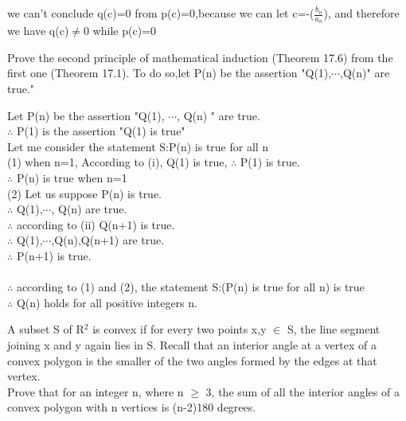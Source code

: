 \documentclass[11pt, a4paper, UTF8]{ctexart}
\begin{document}
\begin{solution}
we can't conclude q(c)=0 from p(c)=0,because we can let c=-($\frac{b_n}{a_n}$), and therefore we have q(c)$\not=0$ while p(c)=0\\

\end{solution}



\begin{problem}[UD:17.14]
  Prove the second principle of mathematical induction (Theorem 17.6) from the first one (Theorem 17.1). To do so,let P(n) be the assertion "Q(1),$\cdots$,Q(n)" are true."
\end{problem}

\begin{solution}
Let P(n) be the  assertion "Q(1), $\cdots$, Q(n) " are true.\\
$\therefore$ P(1) is the assertion "Q(1) is true"\\
Let me consider the statement S:P(n) is true for all n\\
(1) when n=1, According to (i), Q(1) is true, $\therefore$ P(1) is true.\\
$\therefore $ P(n) is true when n=1\\
(2) Let us suppose P(n) is true.\\
$\therefore$ Q(1),$\cdots$, Q(n) are true.\\
$\therefore$ according to (ii) Q(n+1) is true.\\
$\therefore$ Q(1),$\cdots$,Q(n),Q(n+1) are true.\\
$\therefore$ P(n+1) is true.\\
\\
$\therefore$ according to (1) and (2), the statement S:(P(n) is true for all n) is true\\
$\therefore$ Q(n) holds for all positive integers n.

\end{solution}



\begin{problem}[UD:17.16]
A subset S of R$^2$ is convex if for every two points x,y $\in$ S, the line segment joining x and y again lies in S. Recall that an interior angle at a vertex of a convex polygon is the smaller of the two angles formed by the edges at that vertex.\\
Prove that for an integer n, where n $\ge$ 3, the sum of all the interior angles of a convex polygon with n vertices is (n-2)180 degrees.
\end{problem}
\end{document}
